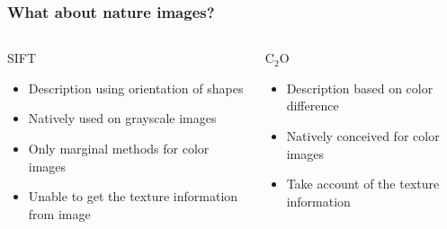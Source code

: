 \documentclass[xcolor=table]{beamer}
\begin{document}
\begin{frame} \frametitle{What about nature images?}


\begin{columns}[t]
  \begin{column}{5cm}
  \begin{block}{SIFT}
	\begin{itemize}
		\item Description using orientation of shapes
		\item Natively used on grayscale images
		\item Only marginal methods for color images 
		\item Unable to get the texture information from image
	\end{itemize}
  \end{block}
  \end{column}

  \begin{column}{5cm}
  \begin{block}{C$_2$O}
  \begin{itemize}
		\item Description based on color difference
		\item Natively conceived for color images
		\item Take account of the texture information
  \end{itemize}
  \end{block}
  \end{column}
 \end{columns}
\end{frame}
\end{document}
